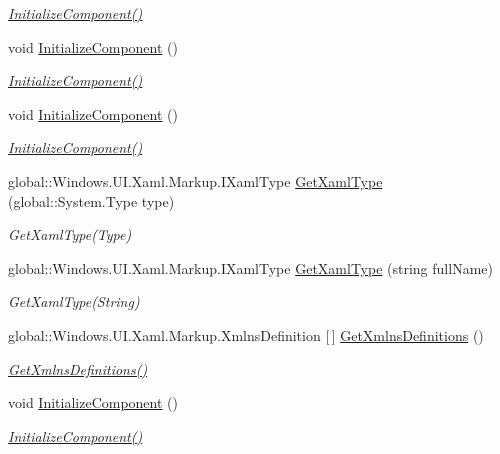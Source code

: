 \begin{DoxyCompactItemize}
\begin{DoxyCompactList}\small\item\em \mbox{\hyperlink{class_r_f_storage_1_1_app_aee12f2c565f216fc400227a9c9446954}{Initialize\+Component()}} \end{DoxyCompactList}\item 
void \mbox{\hyperlink{class_r_f_storage_1_1_app_aee12f2c565f216fc400227a9c9446954}{Initialize\+Component}} ()
\begin{DoxyCompactList}\small\item\em \mbox{\hyperlink{class_r_f_storage_1_1_app_aee12f2c565f216fc400227a9c9446954}{Initialize\+Component()}} \end{DoxyCompactList}\item 
void \mbox{\hyperlink{class_r_f_storage_1_1_app_aee12f2c565f216fc400227a9c9446954}{Initialize\+Component}} ()
\begin{DoxyCompactList}\small\item\em \mbox{\hyperlink{class_r_f_storage_1_1_app_aee12f2c565f216fc400227a9c9446954}{Initialize\+Component()}} \end{DoxyCompactList}\item 
global\+::\+Windows.\+U\+I.\+Xaml.\+Markup.\+I\+Xaml\+Type \mbox{\hyperlink{class_r_f_storage_1_1_app_ad5b51fc1d1b2ccdbd2ea4da96fbe76d2}{Get\+Xaml\+Type}} (global\+::\+System.\+Type type)
\begin{DoxyCompactList}\small\item\em Get\+Xaml\+Type(\+Type) \end{DoxyCompactList}\item 
global\+::\+Windows.\+U\+I.\+Xaml.\+Markup.\+I\+Xaml\+Type \mbox{\hyperlink{class_r_f_storage_1_1_app_a2c3de99968533c4831c30ccd73100810}{Get\+Xaml\+Type}} (string full\+Name)
\begin{DoxyCompactList}\small\item\em Get\+Xaml\+Type(\+String) \end{DoxyCompactList}\item 
global\+::\+Windows.\+U\+I.\+Xaml.\+Markup.\+Xmlns\+Definition \mbox{[}$\,$\mbox{]} \mbox{\hyperlink{class_r_f_storage_1_1_app_adcb9eaad4dc10dc6bac7bc34b8b33797}{Get\+Xmlns\+Definitions}} ()
\begin{DoxyCompactList}\small\item\em \mbox{\hyperlink{class_r_f_storage_1_1_app_adcb9eaad4dc10dc6bac7bc34b8b33797}{Get\+Xmlns\+Definitions()}} \end{DoxyCompactList}\item 
void \mbox{\hyperlink{class_r_f_storage_1_1_app_aee12f2c565f216fc400227a9c9446954}{Initialize\+Component}} ()
\begin{DoxyCompactList}\small\item\em \mbox{\hyperlink{class_r_f_storage_1_1_app_aee12f2c565f216fc400227a9c9446954}{Initialize\+Component()}} \end{DoxyCompactList}\end{DoxyCompactItemize}
